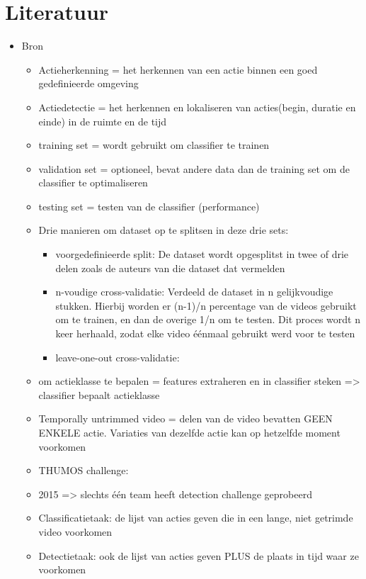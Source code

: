 \chapter{Literatuur}

\begin{itemize}
		\item Bron \cite{MinKang2016}
	\begin{itemize}
		\item Actieherkenning = het herkennen van een actie binnen een goed gedefinieerde omgeving 
		\item Actiedetectie = het herkennen en lokaliseren van acties(begin, duratie en einde) in de ruimte en de tijd
		\item training set = wordt gebruikt om classifier te trainen
		\item validation set = optioneel, bevat andere data dan de training set om de classifier te optimaliseren
		\item testing set = testen van de classifier (performance)
		\item Drie manieren om dataset op te splitsen in deze drie sets:
		\begin{itemize}
			\item voorgedefinieerde split: De dataset wordt opgesplitst  in twee of drie delen zoals de auteurs van die dataset dat vermelden
			\item n-voudige cross-validatie: Verdeeld de dataset in n gelijkvoudige stukken. Hierbij worden er (n-1)/n  percentage van de videos gebruikt om te trainen, en dan de overige 1/n om te testen. Dit proces wordt n keer herhaald, zodat elke video éénmaal gebruikt werd voor te testen
			\item leave-one-out cross-validatie:
		\end{itemize}
		
		
		\item  om actieklasse te bepalen = features extraheren en in classifier steken => classifier bepaalt actieklasse
		\item Temporally untrimmed video = delen van de video bevatten GEEN ENKELE actie. Variaties van dezelfde actie kan op hetzelfde moment voorkomen
		
		\item THUMOS challenge:
		\item 2015 => slechts één team heeft detection challenge geprobeerd
		
		\item 	Classificatietaak: de lijst van acties geven die in een lange, niet getrimde video voorkomen
		\item 	Detectietaak: ook de lijst van acties geven PLUS de plaats in tijd waar ze voorkomen
	\end{itemize}


\end{itemize}
